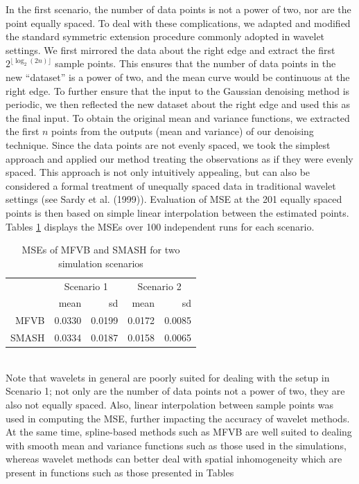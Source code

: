 \documentclass[12pt]{article}
\begin{document}
In the first scenario, the number of data points is not a power of two, nor are the point equally spaced. To deal with these complications, we adapted and modified the standard symmetric extension procedure commonly adopted in wavelet settings. We first mirrored the data about the right edge and extract the first $2^{\lfloor\log_2(2n)\rfloor}$ sample points. This ensures that the number of data points in the new ``dataset'' is a power of two, and the mean curve would be continuous at the right edge. To further ensure that the input to the Gaussian denoising method is periodic, we then reflected the new dataset about the right edge and used this as the final input. To obtain the original mean and variance functions, we extracted the first $n$ points from the outputs (mean and variance) of our denoising technique. Since the data points are not evenly spaced, we took the simplest approach and applied our method treating the observations as if they were evenly spaced. This approach is not only intuitively appealing, but can also be considered a formal treatment of unequally spaced data in traditional wavelet settings (see Sardy et al. (1999)). Evaluation of MSE at the 201 equally spaced points is then based on simple linear interpolation between the estimated points. Tables \ref{table:mfvb_comp} displays the MSEs over 100 independent runs for each scenario.
\begin{table}[ht]
\centering
\begin{tabular}{rrrrr}
\hline
& \multicolumn{2}{c}{Scenario 1}&\multicolumn{2}{c}{Scenario 2}\\
\cline{2-5}
& mean & sd & mean & sd \\
\hline
MFVB & 0.0330 & 0.0199 & 0.0172 & 0.0085 \\
SMASH & 0.0334 & 0.0187 & 0.0158 & 0.0065 \\
\hline
\end{tabular}
\caption{MSEs of MFVB and SMASH for two simulation scenarios}
\label{table:mfvb_comp}
\end{table}
\bigskip\\
Note that wavelets in general are poorly suited for dealing with the setup in Scenario 1; not only are the number of data points not a power of two, they are also not equally spaced. Also, linear interpolation between sample points was used in computing the MSE, further impacting the accuracy of wavelet methods. At the same time, spline-based methods such as MFVB are well suited to dealing with smooth mean and variance functions such as those used in the simulations, whereas wavelet methods can better deal with spatial inhomogeneity which are present in functions such as those presented in Tables
\end{document}
